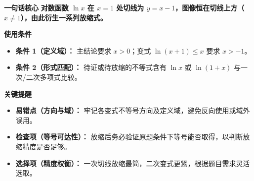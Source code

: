\begin{summarybox}
\textbf{\textcolor{CSummary}{一句话核心}}
\textbf{对数函数 $\ln x$ 在 $x=1$ 处切线为 $y=x-1$，图像恒在切线上方（$x\neq1$），由此衍生一系列放缩式。}

\medskip
\textbf{\textcolor{CSummary}{使用条件}}
\begin{itemize}[leftmargin=*, itemsep=0.5em, topsep=0.4em]
    \item \textbf{条件 1（定义域）：} 主结论要求 $x>0$；变式 $\ln(x+1)\leq x$ 要求 $x>-1$。
    \item \textbf{条件 2（形式匹配）：} 待证或待放缩的不等式含有 $\ln x$ 或 $\ln(1+x)$ 与一次/二次多项式比较。
\end{itemize}

\medskip
\textbf{\textcolor{CSummary}{关键提醒}}
\begin{itemize}[leftmargin=*, itemsep=0.5em, topsep=0.4em]
    \item \textbf{易错点（方向与域）：} 牢记各变式不等号方向及定义域，避免反向使用或域外误用。
    \item \textbf{检查项（等号可达性）：} 放缩后务必验证原题条件下等号能否取得，以判断放缩精度是否足够。
    \item \textbf{选择项（精度权衡）：} 一次切线放缩最简，二次变式更紧，根据题目需求灵活选取。
\end{itemize}
\end{summarybox}
